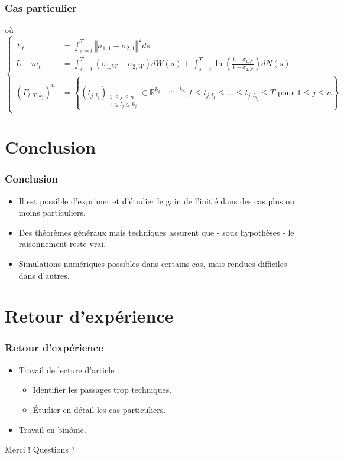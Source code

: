 \documentclass{beamer}
\begin{document}
\begin{frame}
\frametitle{Cas particulier}
où
\scriptsize
\begin{displaymath}
\begin{cases}
{\Sigma}_t &= \displaystyle \int_{s = t}^{T} \left\Vert \sigma_{1, 1} - \sigma_{2, 1} \right\Vert^2 ds \\
L - m_t &= \displaystyle \int_{s = t}^{T} \left( \sigma_{1, W} - \sigma_{2, W} \right) dW(s) + \int_{s = t}^{T} \ln \left( \frac{1 + \sigma_{1, N}}{1 + \sigma_{2, N}} \right) dN(s) \\
{\left( F_{t, T, k_j}\right)}^n &= \left\lbrace \left( t_{j, l_j} \right)_{\substack{1\leq j\leq n \\ 1\leq l_j\leq k_j}} \in \mathbb{R}^{k_1 + ... + k_n}, t \leq t_{j, l_1} \leq ... \leq t_{j, l_{k_j}} \leq T \text{ pour } 1 \leq j \leq n \right\rbrace
\end{cases}
\end{displaymath}
\end{frame}

\section{Conclusion}

\begin{frame}
\frametitle{Conclusion}
\begin{itemize}
\item Il est possible d'exprimer et d'étudier le gain de l'initié dans des cas plus ou moins particuliers.
\item Des théorèmes généraux mais techniques assurent que - sous hypothèses - le raisonnement reste vrai.
\item Simulations numériques possibles dans certains cas, mais rendues difficiles dans d'autres.
\end{itemize}
\end{frame}

\section{Retour d'expérience}

\begin{frame}
\frametitle{Retour d'expérience}
\begin{itemize}
\item Travail de lecture d'article :
	\begin{itemize}
	\item Identifier les passages trop techniques.
	\item Étudier en détail les cas particuliers.
	\end{itemize}
\item Travail en binôme.
\end{itemize}
\end{frame}


\begin{frame}
\Huge \center Merci !
\huge\center Questions ?
\end{frame}


\begin{frame}
\end{frame} %
\end{document}
